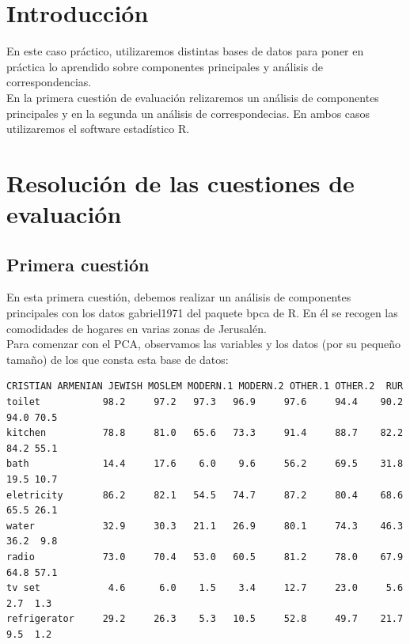 \documentclass[12pt,a4paper,twoside,openright,titlepage,final]{article}
\author{José Ignacio Escribano}
\title{}
\begin{document}
\setcounter{page}{1}


\listoffigures
\thispagestyle{empty}
\newpage

\listoftables
\thispagestyle{empty}
\newpage

\tableofcontents
\thispagestyle{empty}
\newpage


\setcounter{page}{1}

\section{Introducción}

En este caso práctico, utilizaremos distintas bases de datos para poner en práctica lo aprendido sobre componentes principales y análisis de correspondencias.\\

En la primera cuestión de evaluación relizaremos un análisis de componentes principales y en la segunda un análisis de correspondecias. En ambos casos utilizaremos el software estadístico R.

\section{Resolución de las cuestiones de evaluación}

\subsection{Primera cuestión}

En esta primera cuestión, debemos realizar un análisis de componentes principales con los datos gabriel1971 del paquete bpca de R. En él se recogen las comodidades de hogares en varias zonas de Jerusalén.\\

Para comenzar con el PCA, observamos las variables y los datos (por su pequeño tamaño) de los que consta esta base de datos:

\begin{Verbatim}[fontsize=\scriptsize]
             CRISTIAN ARMENIAN JEWISH MOSLEM MODERN.1 MODERN.2 OTHER.1 OTHER.2  RUR
toilet           98.2     97.2   97.3   96.9     97.6     94.4    90.2    94.0 70.5
kitchen          78.8     81.0   65.6   73.3     91.4     88.7    82.2    84.2 55.1
bath             14.4     17.6    6.0    9.6     56.2     69.5    31.8    19.5 10.7
eletricity       86.2     82.1   54.5   74.7     87.2     80.4    68.6    65.5 26.1
water            32.9     30.3   21.1   26.9     80.1     74.3    46.3    36.2  9.8
radio            73.0     70.4   53.0   60.5     81.2     78.0    67.9    64.8 57.1
tv set            4.6      6.0    1.5    3.4     12.7     23.0     5.6     2.7  1.3
refrigerator     29.2     26.3    5.3   10.5     52.8     49.7    21.7     9.5  1.2
\end{Verbatim}
\end{document}
